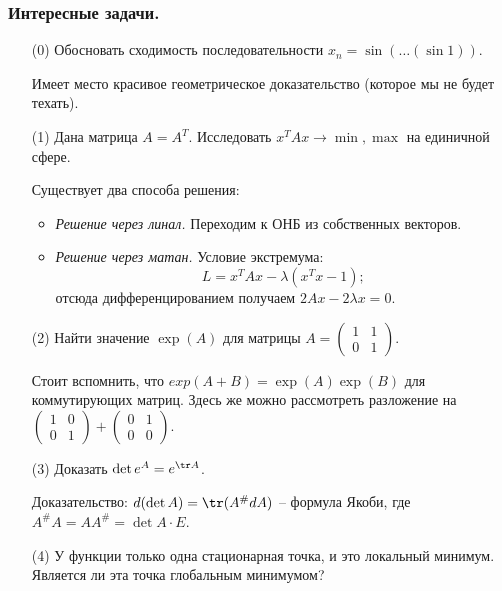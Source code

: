 \subsubsection{Интересные задачи.}
\begin{itemize}
    \item[(0)] Обосновать сходимость последовательности $x_n = \sin( \ldots (\sin 1))$.
    
    Имеет место красивое геометрическое доказательство (которое мы не будет техать). 
    \item[(1)] Дана матрица $A = A^T$. Исследовать $x^T A x \to \min, \max$ на единичной сфере.

    Существует два способа решения:
    \begin{itemize}
        \item \textit{Решение через линал.} Переходим к ОНБ из собственных векторов.
        \item \textit{Решение через матан.} Условие экстремума:
        \begin{equation*}
            L = x^TAx - \lambda (x^Tx - 1);
        \end{equation*}
        отсюда дифференцированием получаем $2Ax - 2\lambda x = 0$.
    \end{itemize}

    \item[(2)] Найти значение $\exp (A)$ для матрицы $\displaystyle A = \begin{pmatrix}
        1 & 1\\
        0 & 1
    \end{pmatrix}$.

    Стоит вспомнить, что $exp(A + B) = \exp(A) \exp(B)$ для коммутирующих матриц. Здесь же можно рассмотреть разложение на $\displaystyle \begin{pmatrix}
        1 & 0\\
        0 & 1
    \end{pmatrix} + \begin{pmatrix}
        0 & 1\\
        0 & 0
    \end{pmatrix}$.
    
    \item[(3)] Доказать $\det e^A = e^{\tr A}$.

    Доказательство: $d(\det A) = \tr (A^\# dA)$ -- формула Якоби, где $A^\#A = AA^\# = \det A \cdot E$.

    \item[(4)] У функции только одна стационарная точка, и это локальный минимум. Является ли эта точка глобальным минимумом?


\end{itemize}
